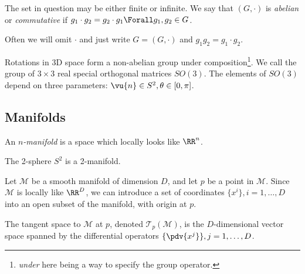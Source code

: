 \documentclass{jknotes}
\begin{document}
The set in question may be either finite or infinite. We say that \((G,\cdot)\) is \emph{abelian} or \emph{commutative} if \(g_1\cdot g_2=g_2\cdot g_1 \Forall g_1, g_2 \in G\).

Often we will omit \(\cdot\) and just write \(G = (G,\cdot)\) and \(g_1g_2 = g_1 \cdot g_2\).

\begin{eg}
    Rotations in 3D space form a non-abelian group under composition\footnote{\emph{under} here being a way to specify the group operator.}. We call the group of \(3\times3\) real special orthogonal matrices \(SO(3)\). The elements of \(SO(3)\) depend on three parameters: \(\vu{n} \in S^2, \theta \in [0,\pi]\).
\end{eg}

\subsection{Manifolds}

\begin{defn}
    An \emph{\(n\)-manifold} is a space which locally looks like \(\RR^n\).
\end{defn}

\begin{eg}
    The 2-sphere $S^2$ is a 2-manifold.
\end{eg}

Let \(\mathcal{M}\) be a smooth manifold of dimension \(D\), and let \(p\) be a point in \(\mathcal{M}\). Since \(\mathcal{M}\) is locally like \(\RR^D\), we can introduce a set of coordinates \(\{x^i\}, i=1,\ldots,D\) into an open subset of the manifold, with origin at \(p\).

\begin{defn}
    The tangent space to \(\mathcal{M}\) at \(p\), denoted \(\mathcal{T}_p(\mathcal{M})\), is the \(D\)-dimensional vector space spanned by the differential operators \(\{\pdv{x^j}\}, j = 1,\ldots,D\).
    \begin{figure}[H]
        \centering
    \end{figure}
\end{defn}
\end{document}
